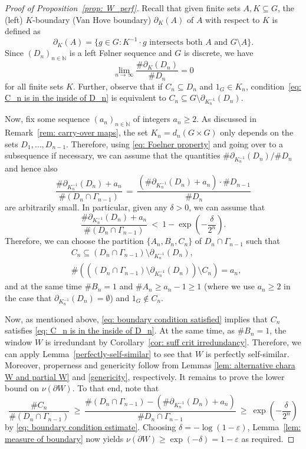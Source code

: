 \documentclass[titlepage,reqno,10pt]{amsart}
\theoremstyle{definition}
\def\N{{\mathbb N}}
\newcommand{\tm}{\subseteq}
\newcommand{\kl}{\left(}
\newcommand{\kr}{\right)}
\begin{document}
\begin{proof}[Proof of Proposition~\ref{prop: W_perf}] Recall that given finite sets $A,K\subseteq G$, the (left) $K$-boundary (Van Hove boundary) $\partial_K(A)$ of $A$ with respect to $K$ is defined as $$ \partial_K(A) = \{g\in G: K^{-1}\cdot g \text{ intersects both } A \text{ and } G\setminus A\}.$$
Since $(D_n)_{n\in\N}$ is a left F\o lner sequence and $G$ is discrete, we have 
\begin{equation} \label{eq: Foelner property} \lim_{n\to\infty} \frac{\# \partial_K(D_n)}{\# D_n} = 0 
\end{equation}
for all finite sets $K$. Further, observe that if $C_n\subseteq D_n$ and $1_G\in K_n$, condition~\eqref{eq: C_n is in the inside of D_n} is equivalent to $C_n \tm G\setminus \partial_{K_n^{-1}}(D_n)$.
\smallskip

Now, fix some sequence $(a_n)_{n\in\N}$ of integers $a_n\geq 2$. As discussed in Remark~\ref{rem: carry-over maps}, 
the set $K_n=d_n(G\times G)$ only depends on the sets $D_1,\ldots,D_{n-1}$. Therefore, using \eqref{eq: Foelner property} and going over to a subsequence if necessary, we can assume that the quantities $\# \partial_{K_n^{-1}}(D_n)/{\# D_n}$ and hence also 
$$
\frac{\#\partial_{K_n^{-1}}(D_n)+a_n}{\#(D_n\cap \Gamma_{n-1})} \ = \ \frac{(\# \partial_{K_n^{-1}}(D_n)+a_n) \cdot \# D_{n-1}}{\# D_n}
$$ are arbitrarily small. In particular, given any $\delta>0$, we can assume that 
$$\frac{\#\partial_{K_n^{-1}}(D_n)+a_n}{\#(D_n\cap \Gamma_{n-1})} \ < \ 1- \exp\kl{-\frac{\delta}{2^n}}\kr.$$
Therefore, we can choose the partition $\{A_n,B_n,C_n\}$ of $D_n\cap \Gamma_{n-1}$ such that 
\begin{eqnarray}
   & C_n  \tm  (D_n\cap \Gamma_{n-1})\setminus \partial_{K_n^{-1}}(D_n), \label{eq: boundary condition satisfied}\\
&\# \kl\kl (D_n\cap \Gamma_{n-1})\setminus \partial_{K_n^{-1}}(D_n)\kr \setminus C_n \kr= a_n, \label{eq: boundary condition estimate}
\end{eqnarray}
and at the same time $\#B_n=1$ and $\#A_n \geq a_n-1\geq 1$ (where we use $a_n\geq 2$ in the case that $\partial_{K_n^{-1}}(D_n)=\emptyset$) and $1_G\notin C_n$. 

Now, as mentioned above, \eqref{eq: boundary condition satisfied} implies that $C_n$ satisfies \eqref{eq: C_n is in the inside of D_n}. At the same time, as $\# B_n=1$, the window $W$ is irredundant by Corollary~\ref{cor: suff crit irredundancy}. Therefore, we can apply Lemma~\ref{perfectly-self-similar} to see that $W$ is perfectly self-similar. Moreover, properness and genericity follow from Lemmas \ref{lem: alternative chara W and partial W} and \ref{genericity}, respectively.  It remains to prove the lower bound on $\nu(\partial W)$. To that end, note that
$$
\frac{\# C_n}{\# (D_n\cap \Gamma_{n-1})} 
\ \geq \ \frac{\# (D_n\cap \Gamma_{n-1}) -(\# \partial_{K_n^{-1}}(D_n) +a_n)}{\# D_n\cap \Gamma_{n-1}} \ \geq \ \exp\kl{-\frac{\delta}{2^n}}\kr
$$
by \eqref{eq: boundary condition estimate}. Choosing $\delta = -\log(1-\varepsilon)$, Lemma~\ref{lem: measure of boundary} now yields $\nu(\partial W) \geq \exp({-\delta})=1-
\varepsilon$ as required.
\end{proof}
\end{document}
